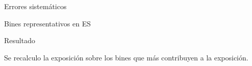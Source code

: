 
\begin{frame}{Errores sistem\'aticos}
	\begin{alertblock}{Bines representativos en ES}
		\begin{center}
		\end{center}
	\end{alertblock}
	\begin{block}{Resultado}
		\begin{center}
			Se recalculo la exposici\'on sobre los bines que m\'as contribuyen a la exposici\'on.
		\end{center}
	\end{block}
\end{frame}

